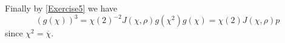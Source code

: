 \documentclass[12pt]{article}
\begin{document}
\begin{enumerate}
Finally by \autoref{Exercise5} we have
\[\left(g\left(\chi\right)\right)^3
=\chi\left(2\right)^{-2}J\left(\chi,\rho\right)g\left(\chi^2\right)
g\left(\chi\right)=\chi\left(2\right)J\left(\chi,\rho\right)p\]
since $\chi^2=\overline{\chi}$.

\end{enumerate}
\end{document}
